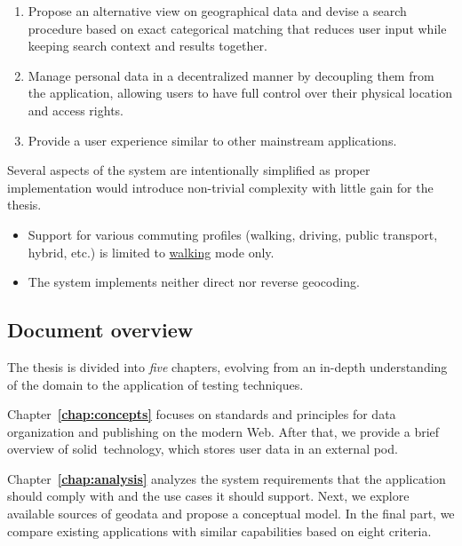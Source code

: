 \begin{enumerate}[label=\textbf{G\arabic*}]
\item\label{itm:g-search} Propose an alternative view on geographical data and devise a search procedure based on exact categorical matching that reduces user input while keeping search context and results together.
\item\label{itm:g-decentral} Manage personal data in a decentralized manner by decoupling them from the application, allowing users to have full control over their physical location and access rights.
\item\label{itm:g-ux} Provide a user experience similar to other mainstream applications.
\end{enumerate}

Several aspects of the system are intentionally simplified as proper implementation would introduce non-trivial complexity with little gain for the thesis.

\begin{itemize}
\item Support for various commuting profiles (walking, driving, public transport, hybrid, etc.) is limited to \underline{walking} mode only.
\item The system implements neither direct nor reverse geocoding.
\end{itemize}

\subsection*{Document overview}

The thesis is divided into \emph{five} chapters, evolving from an in-depth understand\-ing of the domain to the application of testing techniques.

Chapter~\textbf{\ref{chap:concepts}} focuses on standards and principles for data organization and publishing on the modern Web. After that, we provide a brief overview of \acs{solid}~technology, which stores user data in an external pod.

Chapter~\textbf{\ref{chap:analysis}} analyzes the system requirements that the application should comply with and the use cases it should support. Next, we explore available sources of geodata and propose a conceptual model. In the final part, we compare existing applications with similar capabilities based on eight criteria.

